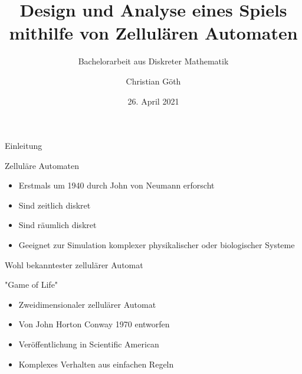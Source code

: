 \documentclass[aspectratio=169]{beamer}
\title[Zelluläre Automaten]{Design und Analyse eines Spiels \newline mithilfe von Zellulären Automaten}
\subtitle{Bachelorarbeit aus Diskreter Mathematik}
\author[C. Göth]{Christian Göth}
\institute[TU Wien]{TU Wien, Vienna, Austria}
\date{26. April 2021}
\begin{document}
\begin{frame}
    \titlepage
\end{frame}



  \begin{frame}{Einleitung}

    \begin{block}{Zelluläre Automaten}
      \begin{itemize}
        \item Erstmals um 1940 durch John von Neumann erforscht \\ %
        \item Sind zeitlich diskret \\
        \item Sind räumlich diskret \\
        \item Geeignet zur Simulation komplexer physikalischer oder biologischer Systeme
      \end{itemize}
    \end{block}

  \end{frame}



  \begin{frame}{Wohl bekanntester zellulärer Automat}
    \begin{block}{"Game of Life"}
      \begin{itemize}
        \item Zweidimensionaler zellulärer Automat
        \item Von John Horton Conway 1970 entworfen %
        \item Veröffentlichung in Scientific American %
        \item Komplexes Verhalten aus einfachen Regeln
      \end{itemize}
    \end{block}

  \end{frame}
\end{document}
